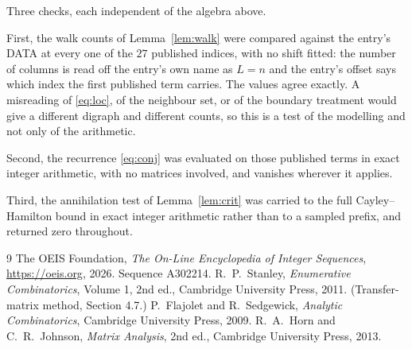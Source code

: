 \documentclass[11pt,a4paper]{article}
\theoremstyle{plain}
\theoremstyle{definition}
\begin{document}
Three checks, each independent of the algebra above.

First, the walk counts of Lemma~\ref{lem:walk} were compared against the entry's DATA at
every one of the $27$ published indices, with no shift fitted: the number of columns is
read off the entry's own name as $L=n$ and the entry's offset says which index the first
published term carries. The values agree exactly. A misreading of \eqref{eq:loc}, of the
neighbour set, or of the boundary treatment would give a different digraph and different
counts, so this is a test of the modelling and not only of the arithmetic.

Second, the recurrence \eqref{eq:conj} was evaluated on those published terms in exact
integer arithmetic, with no matrices involved, and vanishes wherever it applies.

Third, the annihilation test of Lemma~\ref{lem:crit} was carried to the full
Cayley--Hamilton bound in exact integer arithmetic rather than to a sampled prefix, and
returned zero throughout.

\begin{thebibliography}{9}
 The OEIS Foundation, \emph{The On-Line Encyclopedia of Integer
Sequences}, \url{https://oeis.org}, 2026. Sequence A302214.
 R.~P.~Stanley, \emph{Enumerative Combinatorics}, Volume 1, 2nd ed.,
Cambridge University Press, 2011. (Transfer-matrix method, Section 4.7.)
 P.~Flajolet and R.~Sedgewick, \emph{Analytic Combinatorics}, Cambridge
University Press, 2009.
 R.~A.~Horn and C.~R.~Johnson, \emph{Matrix Analysis}, 2nd ed., Cambridge
University Press, 2013.
\end{thebibliography}
\end{document}
